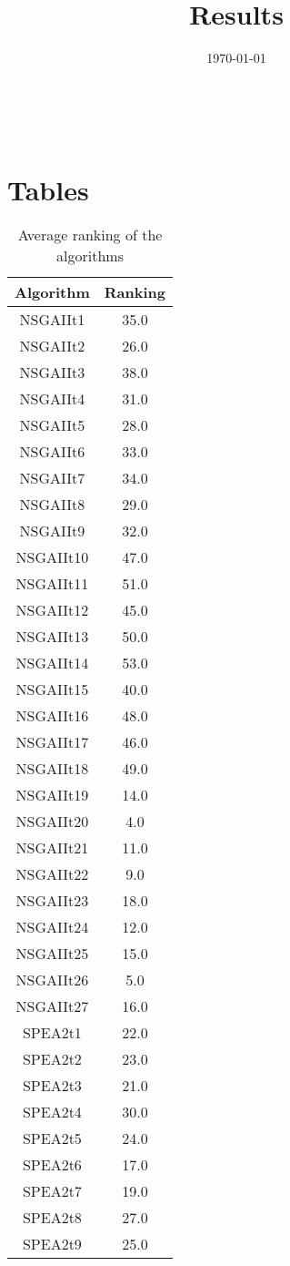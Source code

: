 \documentclass{article}
\title{Results}
\author{}
\date{\today}
\begin{document}
\oddsidemargin 0in \topmargin 0in\maketitle
\
\section{Tables}
\begin{table}[!htp]
\centering
\caption{Average ranking of the algorithms}
\begin{tabular}{c|c}
Algorithm&Ranking\\
\hline
NSGAIIt1&35.0\\
NSGAIIt2&26.0\\
NSGAIIt3&38.0\\
NSGAIIt4&31.0\\
NSGAIIt5&28.0\\
NSGAIIt6&33.0\\
NSGAIIt7&34.0\\
NSGAIIt8&29.0\\
NSGAIIt9&32.0\\
NSGAIIt10&47.0\\
NSGAIIt11&51.0\\
NSGAIIt12&45.0\\
NSGAIIt13&50.0\\
NSGAIIt14&53.0\\
NSGAIIt15&40.0\\
NSGAIIt16&48.0\\
NSGAIIt17&46.0\\
NSGAIIt18&49.0\\
NSGAIIt19&14.0\\
NSGAIIt20&4.0\\
NSGAIIt21&11.0\\
NSGAIIt22&9.0\\
NSGAIIt23&18.0\\
NSGAIIt24&12.0\\
NSGAIIt25&15.0\\
NSGAIIt26&5.0\\
NSGAIIt27&16.0\\
SPEA2t1&22.0\\
SPEA2t2&23.0\\
SPEA2t3&21.0\\
SPEA2t4&30.0\\
SPEA2t5&24.0\\
SPEA2t6&17.0\\
SPEA2t7&19.0\\
SPEA2t8&27.0\\
SPEA2t9&25.0\\

\end{tabular}
\end{table}
\end{document}
